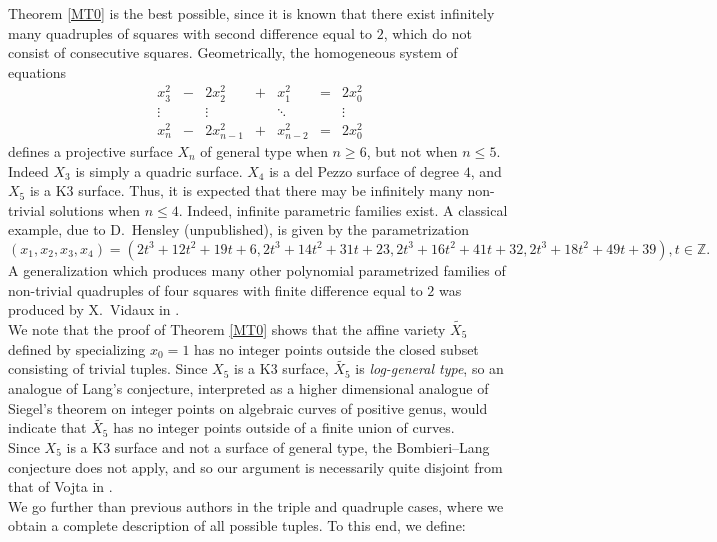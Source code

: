 \documentclass[letterpaper,10pt]{amsart}
\newcommand{\bZ}{{\mathbb{Z}}}
\theoremstyle{definition}
\numberwithin{equation}{section}
\begin{document}
	Theorem \ref{MT0} is the best possible, since it is known that there exist infinitely many quadruples of squares with second difference equal to $2$, which do not consist of consecutive squares. Geometrically, the homogeneous system of equations 
	\begin{equation} \label{buchsys} \begin{matrix} x_3^2 & - & 2 x_2^2 & + & x_1^2 & = & 2x_0^2 \\ \vdots & & \vdots & & \ddots &  &  \vdots \\ x_{n}^2 & - & 2 x_{n-1}^2 & + & x_{n-2}^2 & = & 2x_0^2\end{matrix} 
	\end{equation}
	defines a projective surface $X_n$ of general type when $n \geq 6$, but not when $n \leq 5$. Indeed $X_3$ is simply a quadric surface. $X_4$ is a del Pezzo surface of degree $4$, and $X_5$ is a $\text{K3}$ surface. Thus, it is expected that there may be infinitely many non-trivial solutions when $n \leq 4$. Indeed, infinite parametric families exist. A classical example, due to D.~Hensley (unpublished), is given by the parametrization 
	\begin{equation} \label{Hens} (x_1, x_2, x_3, x_4) = (2t^3 +12t^2 + 19t + 6, 2t^3 + 14t^2 + 31t + 23, 2t^3 + 16t^2 + 41t + 32, 2t^3 + 18t^2 + 49t+ 39), t \in \bZ.
	\end{equation}
	A generalization which produces many other polynomial parametrized families of non-trivial quadruples of four squares with finite difference equal to $2$ was produced by X.~Vidaux in \cite{Vid}. \\
	
	We note that the proof of Theorem \ref{MT0} shows that the affine variety $\widetilde{X_5}$ defined by specializing $x_0 = 1$ has no integer points outside the closed subset consisting of trivial tuples. Since $X_5$ is a K3 surface, $\widetilde{X_5}$ is \emph{log-general type}, so an analogue of Lang's conjecture, interpreted as a higher dimensional analogue of Siegel's theorem on integer points on algebraic curves of positive genus, would indicate that $\widetilde{X_5}$ has no integer points outside of a finite union of curves. \\
	
	Since $X_5$ is a K3 surface and not a surface of general type, the Bombieri--Lang conjecture does not apply, and so our argument is necessarily quite disjoint from that of Vojta in \cite{Voj}. \\ 
	
	We go further than previous authors in the triple and quadruple cases, where we obtain a complete description of all possible tuples. To this end, we define:
	
\end{document}
